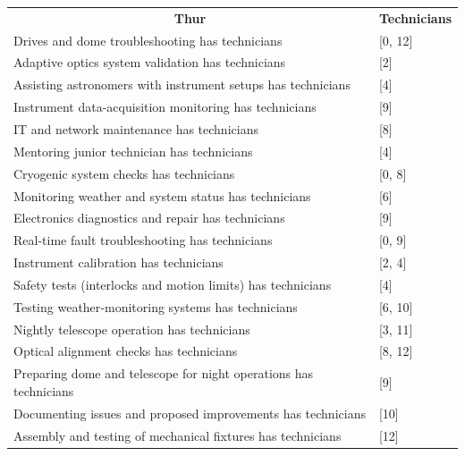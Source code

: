\documentclass{article}
\begin{document}
\begin{table}[!ht]
\begin{tabular}{ll}
\multicolumn{1}{c}{\textbf{Thur}}                                  & \multicolumn{1}{c}{\textbf{Technicians}} \\
Drives and dome troubleshooting has technicians                   & {[}0, 12{]}                              \\
Adaptive optics system validation has technicians                 & {[}2{]}                                  \\
Assisting astronomers with instrument setups has technicians      & {[}4{]}                                  \\
Instrument data-acquisition monitoring has technicians            & {[}9{]}                                  \\
IT and network maintenance has technicians                        & {[}8{]}                                  \\
Mentoring junior technician has technicians                            & {[}4{]}                                  \\
Cryogenic system checks has technicians                           & {[}0, 8{]}                               \\
Monitoring weather and system status has technicians              & {[}6{]}                                  \\
Electronics diagnostics and repair has technicians                & {[}9{]}                                  \\
Real-time fault troubleshooting has technicians                   & {[}0, 9{]}                               \\
Instrument calibration has technicians                            & {[}2, 4{]}                               \\
Safety tests (interlocks and motion limits) has technicians       & {[}4{]}                                  \\
Testing weather‑monitoring systems has technicians                & {[}6, 10{]}                              \\
Nightly telescope operation has technicians                       & {[}3, 11{]}                              \\
Optical alignment checks has technicians                          & {[}8, 12{]}                              \\
Preparing dome and telescope for night operations has technicians & {[}9{]}                                  \\
Documenting issues and proposed improvements has technicians      & {[}10{]}                                 \\
Assembly and testing of mechanical fixtures has technicians       & {[}12{]}                                 \\                              
\end{tabular}
\end{table}
\end{document}
